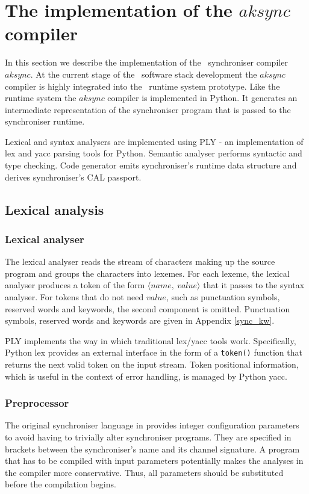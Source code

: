 \section{The implementation of the $aksync$ compiler}
In this section we describe the implementation of the \ak\ synchroniser compiler $aksync$. At the current stage of the \ak\ software stack development the $aksync$ compiler is highly integrated into the \ak\ runtime system prototype. Like the runtime system the $aksync$ compiler is implemented in Python. It generates an intermediate representation of the synchroniser program that is passed to the synchroniser runtime.

Lexical and syntax analysers are implemented using PLY \cite{ply} - an implementation of lex and yacc parsing tools for Python. Semantic analyser performs syntactic and type checking. Code generator emits synchroniser's runtime data structure and derives synchroniser's CAL passport.


\subsection{Lexical analysis}
  \subsubsection{Lexical analyser}
The lexical analyser reads the stream of characters making up the source program and groups the characters into lexemes. For each lexeme, the lexical analyser produces a token of the form $\langle name, \: value \rangle$ that it passes to the syntax analyser. For tokens that do not need $value$, such as punctuation symbols, reserved words and keywords, the second component is omitted. Punctuation symbols, reserved words and keywords are given in Appendix \ref{sync_kw}.

PLY implements the way in which traditional lex/yacc tools work. Specifically, Python lex provides an external interface in the form of a \texttt{token()} function that returns the next valid token on the input stream. Token positional information, which is useful in the context of error handling, is managed by Python yacc.

  \subsubsection{Preprocessor}
The original synchroniser language in \cite{astrakahn} provides integer configuration parameters to avoid having to trivially alter synchroniser programs. They are specified in brackets between the synchroniser's name and its channel signature. A program that has to be compiled with input parameters potentially makes the analyses in the compiler more conservative. Thus, all parameters should be substituted before the compilation begins.

